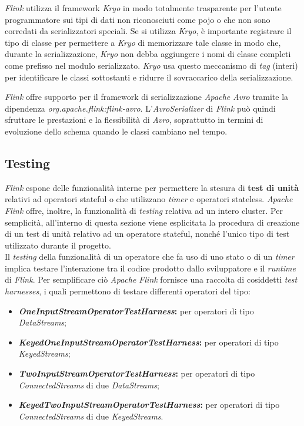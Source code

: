 \label{sec:kryo}
\textit{Flink} utilizza il \gls{framework} \textit{Kryo} in modo totalmente trasparente per l'utente programmatore sui tipi di dati non riconosciuti come \gls{pojo} o che non sono corredati da serializzatori speciali. Se si utilizza \textit{Kryo}, è importante registrare il tipo di classe per permettere a \textit{Kryo} di memorizzare tale classe in modo che, durante la \gls{serializzazione}, \textit{Kryo} non debba aggiungere i nomi di classe completi come prefisso nel modulo serializzato. \textit{Kryo} usa questo meccanismo di \textit{tag} (interi) per identificare le classi sottostanti e ridurre il sovraccarico della \gls{serializzazione}.



\label{sec:avro}
\textit{Flink} offre supporto per il \gls{framework} di \gls{serializzazione} \textit{Apache Avro} tramite la dipendenza \textit{org.apache.flink:flink-avro}. L'\textit{AvroSerializer} di \textit{Flink} può quindi sfruttare le prestazioni e la flessibilità di \textit{Avro}, soprattutto in termini di evoluzione dello schema quando le classi cambiano nel tempo.

\subsection{Testing}\label{sec:flink-testing}
\textit{Flink} espone delle funzionalità interne per permettere la stesura di \textbf{test di unità} relativi ad operatori \gls{stateful} o che utilizzano \textit{timer} e operatori \gls{stateless}. \textit{Apache Flink} offre, inoltre, la funzionalità di \textit{testing} relativa ad un intero \gls{cluster}. Per semplicità, all'interno di questa sezione viene esplicitata la procedura di creazione di un test di unità relativo ad un operatore \gls{stateful}, nonché l'unico tipo di test utilizzato durante il progetto.\\
Il \textit{testing} della funzionalità di un operatore che fa uso di uno stato o di un \textit{timer} implica testare l'interazione tra il codice prodotto dallo sviluppatore e il \textit{runtime} di \textit{Flink}. Per semplificare ciò \textit{Apache Flink} fornisce una raccolta di cosiddetti \textit{test harnesses}, i quali permettono di testare differenti operatori del tipo:
\begin{itemize}
	\item{\textbf{\textit{OneInputStreamOperatorTestHarness}:} per operatori di tipo \textit{DataStreams};}
	\item{\textbf{\textit{KeyedOneInputStreamOperatorTestHarness}:} per operatori di tipo \textit{KeyedStreams};}
	\item{\textbf{\textit{TwoInputStreamOperatorTestHarness}:} per operatori di tipo \textit{ConnectedStreams} di due \textit{DataStreams};}
	\item{\textbf{\textit{KeyedTwoInputStreamOperatorTestHarness}:} per operatori di tipo \textit{ConnectedStreams} di due \textit{KeyedStreams}.}
\end{itemize}

